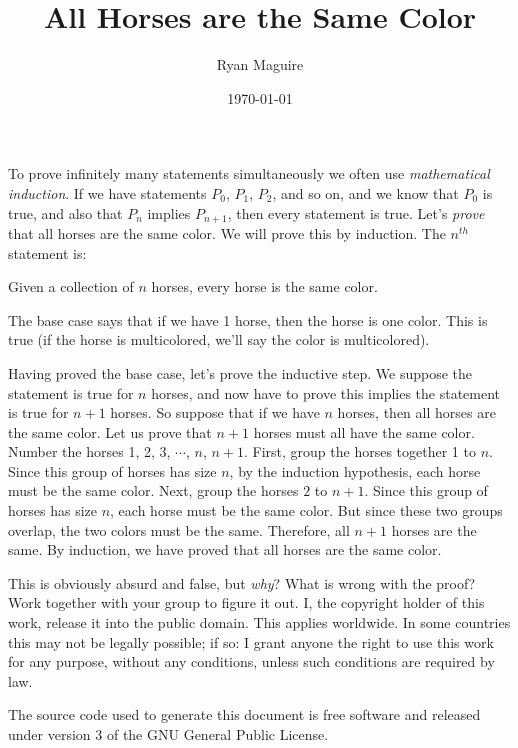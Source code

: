 \documentclass{article}
\title{All Horses are the Same Color}
\author{Ryan Maguire}
\date{\today}
\begin{document}
    \maketitle
    To prove infinitely many statements simultaneously we often use
    \textit{mathematical induction}. If we have statements
    $P_{0}$, $P_{1}$, $P_{2}$, and so on, and we know that $P_{0}$ is true,
    and also that $P_{n}$ implies $P_{n+1}$, then every statement is true.
    Let's \textit{prove} that all horses are the same color.
    We will prove this by induction. The $n^{th}$ statement is:
    \begin{center}
        Given a collection of $n$ horses, every horse is the same color.
    \end{center}
    \par\hfill\par
    The base case says that if we have 1 horse, then the horse is one color.
    This is true (if the horse is multicolored, we'll say the color is
    multicolored).
    \par\hfill\par
    Having proved the base case, let's prove the inductive step. We suppose
    the statement is true for $n$ horses, and now have to prove this implies the
    statement is true for $n+1$ horses. So suppose that if we have $n$ horses,
    then all horses are the same color. Let us prove that $n+1$ horses must
    all have the same color. Number the horses 1, 2, 3, $\cdots$, $n$, $n+1$.
    First, group the horses together 1 to $n$. Since this group of horses has
    size $n$, by the induction hypothesis, each horse must be the same color.
    Next, group the horses $2$ to $n+1$. Since this group of horses has size
    $n$, each horse must be the same color. But since these two groups overlap,
    the two colors must be the same. Therefore, all $n+1$ horses are the same.
    By induction, we have proved that all horses are the same color.
    \par\hfill\par
    This is obviously absurd and false, but \textit{why}? What is wrong with
    the proof? Work together with your group to figure it out.
    \newpage
    I, the copyright holder of this work, release it into the public domain.
    This applies worldwide. In some countries this may not be legally possible;
    if so: I grant anyone the right to use this work for any purpose, without
    any conditions, unless such conditions are required by law.
    \par\hfill\par
    The source code used to generate this document is free software and released
    under version 3 of the GNU General Public License.
\end{document}
